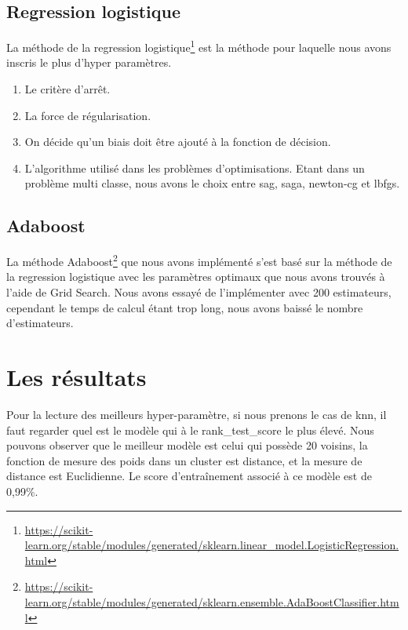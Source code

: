 \documentclass[12pt]{article}
\begin{document}
\subsection{Regression logistique}
La méthode de la regression logistique\footnote{\url{https://scikit-learn.org/stable/modules/generated/sklearn.linear_model.LogisticRegression.html}} est la méthode pour laquelle nous avons inscris le plus d'hyper paramètres.
\begin{enumerate}
\item Le critère d'arrêt.
\item La force de régularisation.
\item On décide qu'un biais doit être ajouté à la fonction de décision.
\item L'algorithme utilisé dans les problèmes d'optimisations. Etant dans un problème multi classe, nous avons le choix entre sag, saga, newton-cg et lbfgs.
\end{enumerate}

\subsection{Adaboost}
La méthode Adaboost\footnote{\url{https://scikit-learn.org/stable/modules/generated/sklearn.ensemble.AdaBoostClassifier.html}} que nous avons implémenté s'est basé sur la méthode de la regression logistique avec les paramètres optimaux que nous avons trouvés à l'aide de Grid Search. Nous avons essayé de l'implémenter avec 200 estimateurs, cependant le temps de calcul étant trop long, nous avons baissé le nombre d'estimateurs.


\newpage
\section{Les résultats}

Pour la lecture des meilleurs hyper-paramètre, si nous prenons le cas de knn, il faut regarder quel est le modèle qui à le rank\_test\_score le plus élevé. Nous pouvons observer que le meilleur modèle est celui qui possède 20 voisins, la fonction de mesure des poids dans un cluster est distance, et la mesure de distance est Euclidienne. Le score d'entraînement associé à ce modèle est de 0,99\%.\\
\end{document}
